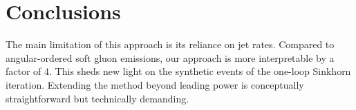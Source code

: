 \section{Conclusions}\label{sec:conclusions}

The main limitation of this approach is its reliance on jet rates.
Compared to angular-ordered soft gluon emissions, our approach is more
interpretable by a factor of 4. This sheds new light on the synthetic
events of the one-loop Sinkhorn iteration. Extending the method beyond
leading power is conceptually straightforward but technically demanding.

